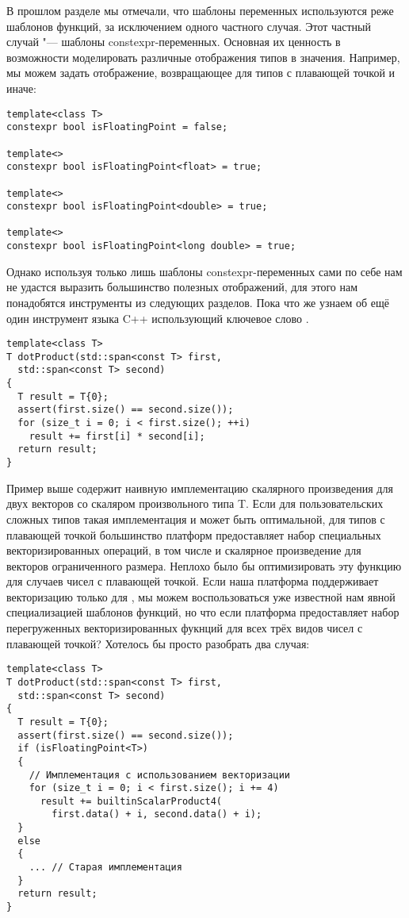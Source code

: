 В прошлом разделе мы отмечали, что шаблоны переменных используются реже шаблонов функций, за исключением одного частного случая.
Этот частный случай "--- шаблоны constexpr-переменных.
Основная их ценность в возможности моделировать различные отображения типов в значения.
Например, мы можем задать отображение, возвращающее  для типов с плавающей точкой и  иначе:
\begin{verbatim}
template<class T>
constexpr bool isFloatingPoint = false;

template<>
constexpr bool isFloatingPoint<float> = true;

template<>
constexpr bool isFloatingPoint<double> = true;

template<>
constexpr bool isFloatingPoint<long double> = true;
\end{verbatim}
Однако используя только лишь шаблоны constexpr-переменных сами по себе нам не удастся выразить большинство полезных отображений, для этого нам понадобятся инструменты из следующих разделов.
Пока что же узнаем об ещё один инструмент языка C++ использующий ключевое слово .
\begin{verbatim}
template<class T>
T dotProduct(std::span<const T> first,
  std::span<const T> second)
{
  T result = T{0};
  assert(first.size() == second.size());
  for (size_t i = 0; i < first.size(); ++i)
    result += first[i] * second[i];
  return result;
}
\end{verbatim}
Пример выше содержит наивную имплементацию скалярного произведения для двух векторов со скаляром произвольного типа T.
Если для пользовательских сложных типов  такая имплементация и может быть оптимальной, для типов с плавающей точкой большинство платформ предоставляет набор специальных векторизированных операций, в том числе и скалярное произведение для векторов ограниченного размера.
Неплохо было бы оптимизировать эту функцию для случаев чисел с плавающей точкой.
Если наша платформа поддерживает векторизацию только для , мы можем воспользоваться уже известной нам явной специализацией шаблонов функций, но что если платформа предоставляет набор перегруженных векторизированных фукнций для всех трёх видов чисел с плавающей точкой? Хотелось бы просто разобрать два случая:
\begin{verbatim}
template<class T>
T dotProduct(std::span<const T> first,
  std::span<const T> second)
{
  T result = T{0};
  assert(first.size() == second.size());
  if (isFloatingPoint<T>)
  {
    // Имплементация с использованием векторизации
    for (size_t i = 0; i < first.size(); i += 4)
      result += builtinScalarProduct4(
        first.data() + i, second.data() + i);
  }
  else
  {
    ... // Старая имплементация
  }
  return result;
}
\end{verbatim}
